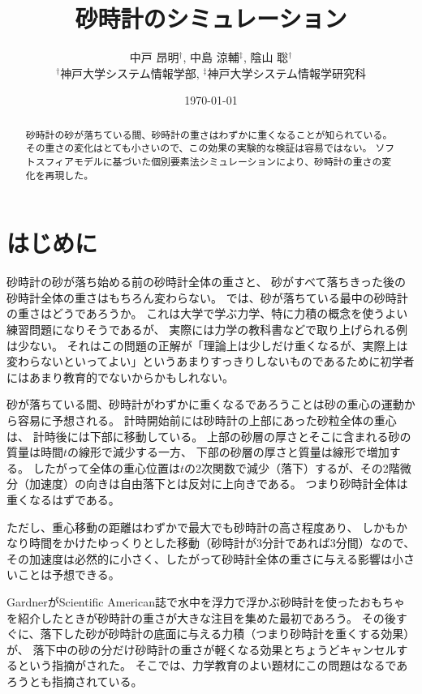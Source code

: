 \documentclass[]{article}
\title{砂時計のシミュレーション}
\author{中戸 昂明$^\dagger$, 中島 涼輔$^\ddagger$, 陰山 聡$^\dagger$\\[0.5em] 
        $^\dagger$神戸大学システム情報学部, $^\ddagger$神戸大学システム情報学研究科}
\date{\today}
\begin{document}
\maketitle


\begin{abstract}
砂時計の砂が落ちている間、砂時計の重さはわずかに重くなることが知られている。
その重さの変化はとても小さいので、この効果の実験的な検証は容易ではない。
ソフトスフィアモデルに基づいた個別要素法シミュレーションにより、砂時計の重さの変化を再現した。
\end{abstract}


\section{はじめに}
砂時計の砂が落ち始める前の砂時計全体の重さと、
砂がすべて落ちきった後の砂時計全体の重さはもちろん変わらない。
では、砂が落ちている最中の砂時計の重さはどうであろうか。
これは大学で学ぶ力学、特に力積の概念を使うよい練習問題になりそうであるが、
実際には力学の教科書などで取り上げられる例は少ない。
それはこの問題の正解が「理論上は少しだけ重くなるが、実際上は変わらないといってよい」というあまりすっきりしないものであるために初学者にはあまり教育的でないからかもしれない。


砂が落ちている間、砂時計がわずかに重くなるであろうことは砂の重心の運動から容易に予想される。
計時開始前には砂時計の上部にあった砂粒全体の重心は、
計時後には下部に移動している。
上部の砂層の厚さとそこに含まれる砂の質量は時間$t$の線形で減少する一方、
下部の砂層の厚さと質量は線形で増加する。
したがって全体の重心位置は$t$の2次関数で減少（落下）するが、その2階微分（加速度）の向きは自由落下とは反対に上向きである。
つまり砂時計全体は重くなるはずである。


ただし、重心移動の距離はわずかで最大でも砂時計の高さ程度あり、
しかもかなり時間をかけたゆっくりとした移動（砂時計が3分計であれば3分間）なので、
その加速度は必然的に小さく、したがって砂時計全体の重さに与える影響は小さいことは予想できる。


GardnerがScientific American誌で水中を浮力で浮かぶ砂時計を使ったおもちゃを紹介したときが砂時計の重さが大きな注目を集めた最初であろう\cite{Gardner1966-eu}。
その後すぐに、落下した砂が砂時計の底面に与える力積（つまり砂時計を重くする効果）が、
落下中の砂の分だけ砂時計の重さが軽くなる効果とちょうどキャンセルするという指摘がされた\cite{Reid1967-jq}。
そこでは、力学教育のよい題材にこの問題はなるであろうとも指摘されている。
\end{document}
